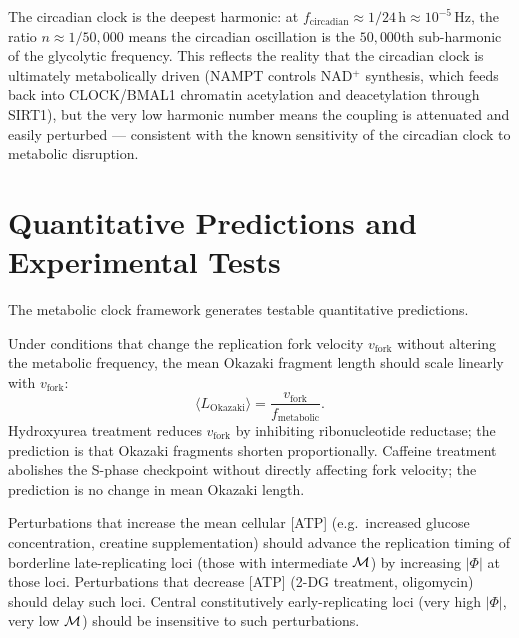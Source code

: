 The circadian clock is the deepest harmonic: at $f_{\mathrm{circadian}} \approx
1/24\,\text{h} \approx 10^{-5}\,\text{Hz}$, the ratio $n \approx 1/50{,}000$
means the circadian oscillation is the $50{,}000$th sub-harmonic of the
glycolytic frequency. This reflects the reality that the circadian clock is
ultimately metabolically driven (NAMPT controls NAD$^+$ synthesis, which feeds
back into CLOCK/BMAL1 chromatin acetylation and deacetylation through SIRT1),
but the very low harmonic number means the coupling is attenuated and easily
perturbed --- consistent with the known sensitivity of the circadian clock to
metabolic disruption.

\section{Quantitative Predictions and Experimental Tests}
\label{sec:clock_predictions}

The metabolic clock framework generates testable quantitative predictions.

\begin{proposition}
\label{prop:okazaki_scaling}
Under conditions that change the replication fork velocity $v_{\mathrm{fork}}$
without altering the metabolic frequency, the mean Okazaki fragment length
should scale linearly with $v_{\mathrm{fork}}$:
\begin{equation}
  \langle L_{\mathrm{Okazaki}} \rangle = \frac{v_{\mathrm{fork}}}{f_{\mathrm{metabolic}}}.
  \label{eq:okazaki_scaling}
\end{equation}
Hydroxyurea treatment reduces $v_{\mathrm{fork}}$ by inhibiting ribonucleotide
reductase; the prediction is that Okazaki fragments shorten proportionally.
Caffeine treatment abolishes the S-phase checkpoint without directly affecting
fork velocity; the prediction is no change in mean Okazaki length.
\end{proposition}

\begin{proposition}
\label{prop:timing_shift}
Perturbations that increase the mean cellular [ATP] (e.g.\ increased glucose
concentration, creatine supplementation) should advance the replication timing
of borderline late-replicating loci (those with intermediate $\mathcal{M}$) by
increasing $|\Phi|$ at those loci. Perturbations that decrease [ATP] (2-DG
treatment, oligomycin) should delay such loci. Central constitutively
early-replicating loci (very high $|\Phi|$, very low $\mathcal{M}$) should be
insensitive to such perturbations.
\end{proposition}

